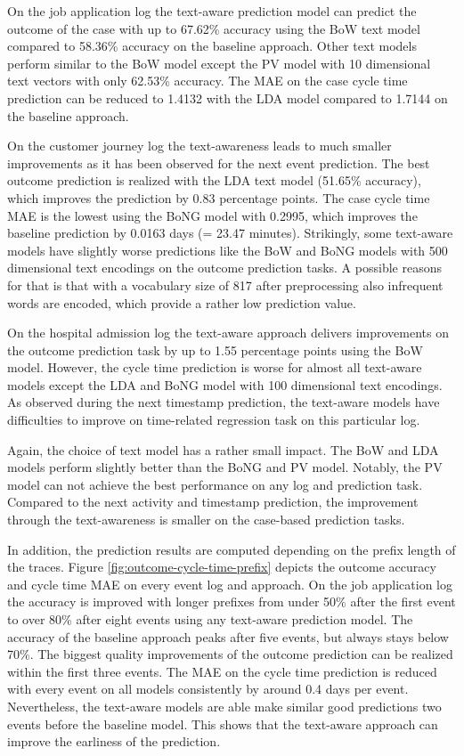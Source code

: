 On the job application log the text-aware prediction model can predict the outcome of the case with up to 67.62\% accuracy using the BoW text model compared to 58.36\% accuracy on the baseline approach.
Other text models perform similar to the BoW model except the PV model with 10 dimensional text vectors with only 62.53\% accuracy.
The MAE on the case cycle time prediction can be reduced to 1.4132 with the LDA model compared to 1.7144 on the baseline approach.

On the customer journey log the text-awareness leads to much smaller improvements as it has been observed for the next event prediction.
The best outcome prediction is realized with the LDA text model (51.65\% accuracy), which improves the prediction by 0.83 percentage points.
The case cycle time MAE is the lowest using the BoNG model with 0.2995, which improves the baseline prediction by 0.0163 days (= 23.47 minutes).
Strikingly, some text-aware models have slightly worse predictions like the BoW and BoNG models with 500 dimensional text encodings on the outcome prediction tasks.
A possible reasons for that is that with a vocabulary size of 817 after preprocessing also infrequent words are encoded, which provide a rather low prediction value.

On the hospital admission log the text-aware approach delivers improvements on the outcome prediction task by up to 1.55 percentage points using the BoW model.
However, the cycle time prediction is worse for almost all text-aware models except the LDA and BoNG model with 100 dimensional text encodings.
As observed during the next timestamp prediction, the text-aware models have difficulties to improve on time-related regression task on this particular log.

Again, the choice of text model has a rather small impact.
The BoW and LDA models perform slightly better than the BoNG and PV model.
Notably, the PV model can not achieve the best performance on any log and prediction task.
Compared to the next activity and timestamp prediction, the improvement through the text-awareness is smaller on the case-based prediction tasks.

In addition, the prediction results are computed depending on the prefix length of the traces.
Figure \ref{fig:outcome-cycle-time-prefix} depicts the outcome accuracy and cycle time MAE on every event log and approach.
On the job application log the accuracy is improved with longer prefixes from under 50\% after the first event to over 80\% after eight events using any text-aware prediction model.
The accuracy of the baseline approach peaks after five events, but always stays below 70\%.
The biggest quality improvements of the outcome prediction can be realized within the first three events.
The MAE on the cycle time prediction is reduced with every event on all models consistently by around 0.4 days per event.
Nevertheless, the text-aware models are able make similar good predictions two events before the baseline model.
This shows that the text-aware approach can improve the earliness of the prediction.

